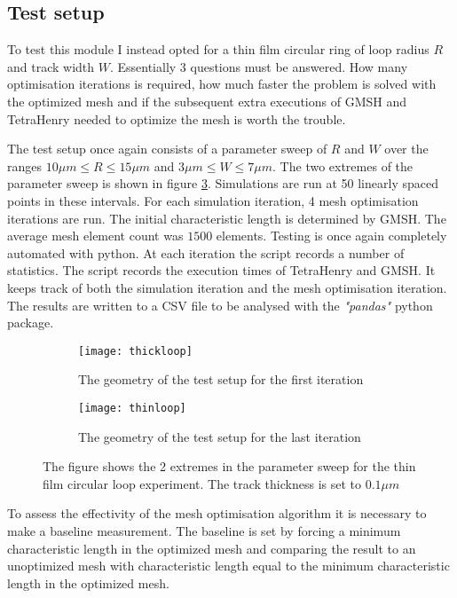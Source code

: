 \subsection{Test setup}
To test this module I instead opted for a thin film circular ring of loop radius $R$ and track width $W$. Essentially 3 questions must be answered. How many optimisation iterations is required, how much faster the problem is solved with the optimized mesh and if the subsequent extra executions of GMSH and TetraHenry needed to optimize the mesh is worth the trouble. \par
The test setup once again consists of a parameter sweep of $R$ and $W$ over the ranges $10 \mu m \le R \le 15 \mu m $ and $  3 \mu m \le W \le7\mu m$. The two extremes of the parameter sweep is shown in figure \ref{fig:testloop}. Simulations are run at 50 linearly spaced points in these intervals. For each simulation iteration, 4 mesh optimisation iterations are run. The initial characteristic length is determined by GMSH. The average mesh element count was $1500$ elements. Testing is once again completely automated with python. At each iteration the script records a number of statistics. The script records the execution times of TetraHenry and GMSH. It keeps track of both the simulation iteration and the mesh optimisation iteration. The results are written to a CSV file to be analysed with the \textit{"pandas"} python package. 
\begin{figure}[H]
    \centering
    \begin{subfigure}[b]{0.48\textwidth}
        \centering
        \texttt{[image: thickloop]}
        \caption{The geometry of the test setup for the first iteration}
        \label{fig:thickloop}
    \end{subfigure}
    \hfill
    \begin{subfigure}[b]{0.48\textwidth}
        \centering
        \texttt{[image: thinloop]}
        \caption{The geometry of the test setup for the last iteration}
        \label{fig:thinloop}
    \end{subfigure}
    \caption{The figure shows the 2 extremes in the parameter sweep for the thin film circular loop experiment. The track thickness is set to $0.1 \mu m$}
    \label{fig:testloop}
\end{figure}
To assess the effectivity of the mesh optimisation algorithm it is necessary to make a baseline measurement. The baseline is set by forcing a minimum characteristic length in the optimized mesh and comparing the result to an unoptimized mesh with characteristic length equal to the minimum characteristic length in the optimized mesh.

